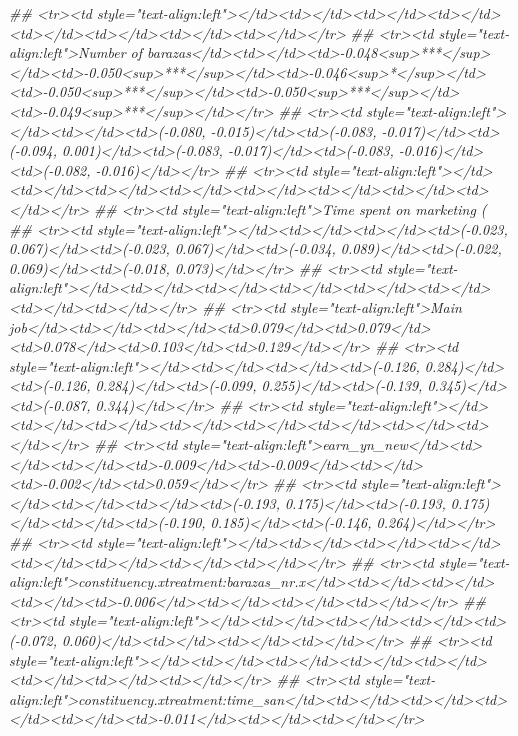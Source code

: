 \documentclass[
]{article}
\newenvironment{Shaded}{\begin{snugshade}}{\end{snugshade}}
\newcommand{\CommentTok}[1]{\textcolor[rgb]{0.56,0.35,0.01}{\textit{#1}}}
\begin{document}
\begin{Shaded}
\begin{Highlighting}[]
{{{{{{{{{{{{{{{\CommentTok{## <tr><td style="text-align:left"></td><td></td><td></td><td></td><td></td><td></td><td></td><td></td></tr>}
\CommentTok{## <tr><td style="text-align:left">Number of barazas</td><td></td><td>-0.048<sup>***</sup></td><td>-0.050<sup>***</sup></td><td>-0.046<sup>*</sup></td><td>-0.050<sup>***</sup></td><td>-0.050<sup>***</sup></td><td>-0.049<sup>***</sup></td></tr>}
\CommentTok{## <tr><td style="text-align:left"></td><td></td><td>(-0.080, -0.015)</td><td>(-0.083, -0.017)</td><td>(-0.094, 0.001)</td><td>(-0.083, -0.017)</td><td>(-0.083, -0.016)</td><td>(-0.082, -0.016)</td></tr>}
\CommentTok{## <tr><td style="text-align:left"></td><td></td><td></td><td></td><td></td><td></td><td></td><td></td></tr>}
\CommentTok{## <tr><td style="text-align:left">Time spent on marketing (%)</td><td></td><td></td><td>0.022</td><td>0.022</td><td>0.028</td><td>0.024</td><td>0.027</td></tr>}
\CommentTok{## <tr><td style="text-align:left"></td><td></td><td></td><td>(-0.023, 0.067)</td><td>(-0.023, 0.067)</td><td>(-0.034, 0.089)</td><td>(-0.022, 0.069)</td><td>(-0.018, 0.073)</td></tr>}
\CommentTok{## <tr><td style="text-align:left"></td><td></td><td></td><td></td><td></td><td></td><td></td><td></td></tr>}
\CommentTok{## <tr><td style="text-align:left">Main job</td><td></td><td></td><td>0.079</td><td>0.079</td><td>0.078</td><td>0.103</td><td>0.129</td></tr>}
\CommentTok{## <tr><td style="text-align:left"></td><td></td><td></td><td>(-0.126, 0.284)</td><td>(-0.126, 0.284)</td><td>(-0.099, 0.255)</td><td>(-0.139, 0.345)</td><td>(-0.087, 0.344)</td></tr>}
\CommentTok{## <tr><td style="text-align:left"></td><td></td><td></td><td></td><td></td><td></td><td></td><td></td></tr>}
\CommentTok{## <tr><td style="text-align:left">earn_yn_new</td><td></td><td></td><td>-0.009</td><td>-0.009</td><td></td><td>-0.002</td><td>0.059</td></tr>}
\CommentTok{## <tr><td style="text-align:left"></td><td></td><td></td><td>(-0.193, 0.175)</td><td>(-0.193, 0.175)</td><td></td><td>(-0.190, 0.185)</td><td>(-0.146, 0.264)</td></tr>}
\CommentTok{## <tr><td style="text-align:left"></td><td></td><td></td><td></td><td></td><td></td><td></td><td></td></tr>}
\CommentTok{## <tr><td style="text-align:left">constituency.xtreatment:barazas_nr.x</td><td></td><td></td><td></td><td>-0.006</td><td></td><td></td><td></td></tr>}
\CommentTok{## <tr><td style="text-align:left"></td><td></td><td></td><td></td><td>(-0.072, 0.060)</td><td></td><td></td><td></td></tr>}
\CommentTok{## <tr><td style="text-align:left"></td><td></td><td></td><td></td><td></td><td></td><td></td><td></td></tr>}
\CommentTok{## <tr><td style="text-align:left">constituency.xtreatment:time_san</td><td></td><td></td><td></td><td></td><td>-0.011</td><td></td><td></td></tr>}
}}}}}}}}}}}}}}}}
\end{Highlighting}
\end{Shaded}
\end{document}

